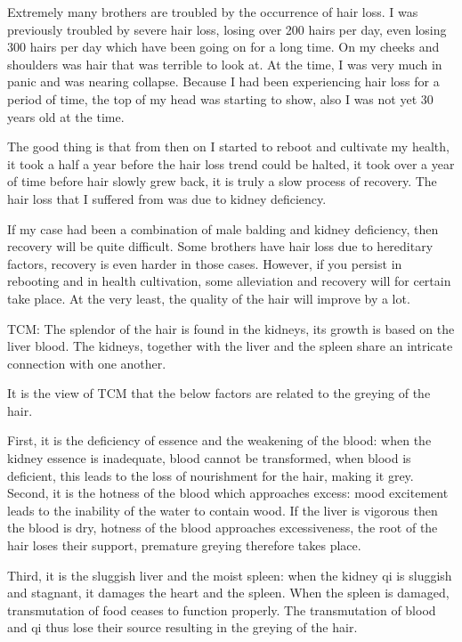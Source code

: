 \documentclass[
]{book}
\begin{document}
Extremely many brothers are troubled by the occurrence of hair loss. I was previously troubled by severe hair loss, losing over 200 hairs per day, even losing 300 hairs per day which have been going on for a long time. On my cheeks and shoulders was hair that was terrible to look at. At the time, I was very much in panic and was nearing collapse. Because I had been experiencing hair loss for a period of time, the top of my head was starting to show, also I was not yet 30 years old at the time.

The good thing is that from then on I started to reboot and cultivate my health, it took a half a year before the hair loss trend could be halted, it took over a year of time before hair slowly grew back, it is truly a slow process of recovery. The hair loss that I suffered from was due to kidney deficiency.

If my case had been a combination of male balding and kidney deficiency, then recovery will be quite difficult. Some brothers have hair loss due to hereditary factors, recovery is even harder in those cases. However, if you persist in rebooting and in health cultivation, some alleviation and recovery will for certain take place. At the very least, the quality of the hair will improve by a lot.

TCM: The splendor of the hair is found in the kidneys, its growth is based on the liver blood. The kidneys, together with the liver and the spleen share an intricate connection with one another.

It is the view of TCM that the below factors are related to the greying of the hair.

First, it is the deficiency of essence and the weakening of the blood: when the kidney essence is inadequate, blood cannot be transformed, when blood is deficient, this leads to the loss of nourishment for the hair, making it grey.
Second, it is the hotness of the blood which approaches excess: mood excitement leads to the inability of the water to contain wood. If the liver is vigorous then the blood is dry, hotness of the blood approaches excessiveness, the root of the hair loses their support, premature greying therefore takes place.

Third, it is the sluggish liver and the moist spleen: when the kidney qi is sluggish and stagnant, it damages the heart and the spleen. When the spleen is damaged, transmutation of food ceases to function properly. The transmutation of blood and qi thus lose their source resulting in the greying of the hair.
\end{document}
